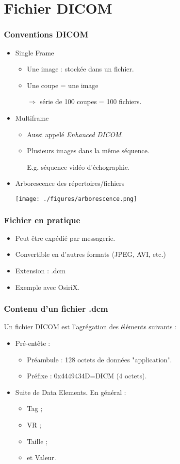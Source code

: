 \section{Fichier DICOM}

\frame
{
	\frametitle{Conventions DICOM}
	\begin{itemize}
		\item Single Frame
		\begin{itemize}
			\item Une image : stock\'ee dans un fichier.
			\item Une coupe = une image
		
			$\Rightarrow$ s\'erie de 100 coupes = 100 fichiers.
		\end{itemize}
		\item Multiframe
		\begin{itemize}
			\item Aussi appel\'e \emph{Enhanced DICOM}.
			\item Plusieurs images dans la m\^eme s\'equence.
			
			E.g. s\'equence vid\'eo d'\'echographie.
		\end{itemize}
		\item Arborescence des r\'epertoires/fichiers
		\begin{center}
			\texttt{[image: ./figures/arborescence.png]}
		\end{center}

	\end{itemize}
}

\frame
{
	\frametitle{Fichier en pratique}
	
	\begin{itemize}
		\item Peut \^etre exp\'edi\'e par messagerie.
		\item Convertible en d'autres formats (JPEG, AVI, etc.)
		\item Extension : .dcm
		\item Exemple avec OsiriX.
	\end{itemize}
}

\frame
{
	\frametitle{Contenu d'un fichier .dcm}
	
	Un fichier DICOM est l'agr\'egation des \'el\'ements suivants :
	\begin{itemize}
		\item Pr\'e-ent\^ete :
		\begin{itemize}
			\item Pr\'eambule : 128 octets de donn\'ees "application".
			\item Pr\'efixe : 0x4449434D=DICM (4 octets).
		\end{itemize}
		\item Suite de Data Elements.
		En g\'en\'eral :
		\begin{itemize}
			\item Tag ;
			\item VR ;
			\item Taille ;
			\item et Valeur.
		\end{itemize}
	\end{itemize}
}


